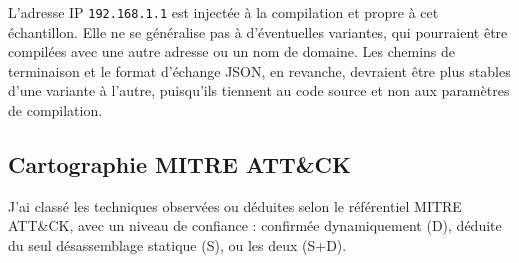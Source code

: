 \noindent L'adresse IP \texttt{192.168.1.1} est injectée à la compilation et propre à cet échantillon. Elle ne se généralise pas à d'éventuelles variantes, qui pourraient être compilées avec une autre adresse ou un nom de domaine. Les chemins de terminaison et le format d'échange JSON, en revanche, devraient être plus stables d'une variante à l'autre, puisqu'ils tiennent au code source et non aux paramètres de compilation.

\subsection{Cartographie MITRE ATT\&CK}
\label{subsec:attack}

J'ai classé les techniques observées ou déduites selon le référentiel MITRE ATT\&CK, avec un niveau de confiance : confirmée dynamiquement (D), déduite du seul désassemblage statique (S), ou les deux (S+D).

